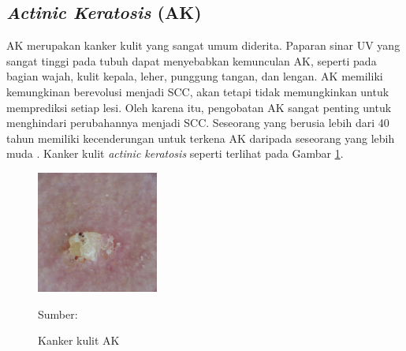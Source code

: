     \subsection{\textit{Actinic Keratosis} (AK)}
    AK merupakan kanker kulit yang sangat umum diderita. Paparan sinar UV yang sangat tinggi pada tubuh dapat menyebabkan kemunculan AK, seperti pada bagian wajah, kulit kepala, leher, punggung tangan, dan lengan. AK memiliki kemungkinan berevolusi menjadi SCC, akan tetapi tidak memungkinkan untuk memprediksi setiap lesi. Oleh karena itu, pengobatan AK sangat penting untuk menghindari perubahannya menjadi SCC. Seseorang yang berusia lebih dari 40 tahun memiliki kecenderungan untuk terkena AK daripada seseorang yang lebih muda \citep{Dianzani2020}. Kanker kulit \textit{actinic keratosis} seperti terlihat pada Gambar \ref{fig:ak}.
    \begin{figure}[H] 
        \begin{center} 
            \includegraphics[width=4cm]{../img/Skin Cancer AK - Latex.jpg}
            \caption{Kanker kulit AK} 
            \label{fig:ak}
            Sumber: \citep{Codella2018,Combalia2019,Tschandl2018}
        \end{center} 
    \end{figure}

